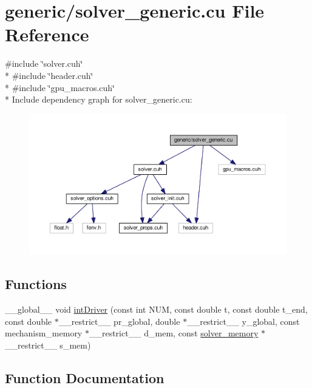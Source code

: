 \hypertarget{solver__generic_8cu}{}\section{generic/solver\+\_\+generic.cu File Reference}
\label{solver__generic_8cu}
{\ttfamily \#include \char`\"{}solver.\+cuh\char`\"{}}\\*
{\ttfamily \#include \char`\"{}header.\+cuh\char`\"{}}\\*
{\ttfamily \#include \char`\"{}gpu\+\_\+macros.\+cuh\char`\"{}}\\*
Include dependency graph for solver\+\_\+generic.\+cu\+:\nopagebreak
\begin{figure}[H]
\begin{center}
\leavevmode
\includegraphics[width=350pt]{solver__generic_8cu__incl}
\end{center}
\end{figure}
\subsection*{Functions}
\begin{DoxyCompactItemize}
\item 
\+\_\+\+\_\+global\+\_\+\+\_\+ void \hyperlink{solver__generic_8cu_a654eac52827012ca836581ce666f4f35}{int\+Driver} (const int N\+UM, const double t, const double t\+\_\+end, const double $\ast$\+\_\+\+\_\+restrict\+\_\+\+\_\+ pr\+\_\+global, double $\ast$\+\_\+\+\_\+restrict\+\_\+\+\_\+ y\+\_\+global, const mechanism\+\_\+memory $\ast$\+\_\+\+\_\+restrict\+\_\+\+\_\+ d\+\_\+mem, const \hyperlink{structsolver__memory}{solver\+\_\+memory} $\ast$\+\_\+\+\_\+restrict\+\_\+\+\_\+ s\+\_\+mem)
\end{DoxyCompactItemize}


\subsection{Function Documentation}
